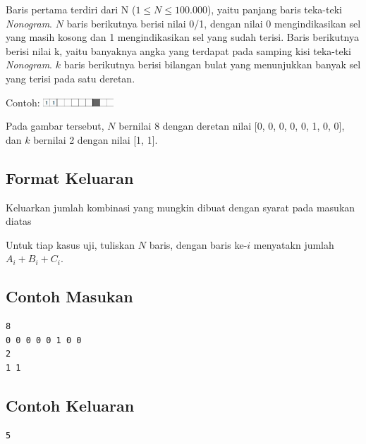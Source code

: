 \documentclass{article}
\begin{document}
Baris pertama terdiri dari N ($1 \leq N \leq 100.000$), yaitu panjang baris teka-teki \textit{Nonogram}.
$N$ baris berikutnya berisi nilai 0/1, dengan nilai 0 mengindikasikan sel yang masih kosong dan 1 mengindikasikan sel yang sudah terisi.
Baris berikutnya berisi nilai k, yaitu banyaknya angka yang terdapat pada samping kisi teka-teki \textit{Nonogram}.
$k$ baris berikutnya berisi bilangan bulat yang menunjukkan banyak sel yang terisi pada satu deretan.

Contoh:
\includegraphics[width=100px]{Homogram-Row}

Pada gambar tersebut, $N$ bernilai 8 dengan deretan nilai [0, 0, 0, 0, 0, 1, 0, 0], dan $k$ bernilai 2 dengan nilai [1, 1].

\subsection*{Format Keluaran}

Keluarkan jumlah kombinasi yang mungkin dibuat dengan syarat pada masukan diatas

Untuk tiap kasus uji, tuliskan $N$ baris, dengan baris ke-$i$ menyatakn jumlah $A_i + B_i + C_i$.
\\

\begin{multicols}{2}
\subsection*{Contoh Masukan}
\begin{lstlisting}
8
0 0 0 0 0 1 0 0
2
1 1
\end{lstlisting}
\columnbreak
\subsection*{Contoh Keluaran}
\begin{lstlisting}
5
\end{lstlisting}
\vfill
\null
\end{multicols}

\pagebreak
\end{document}
